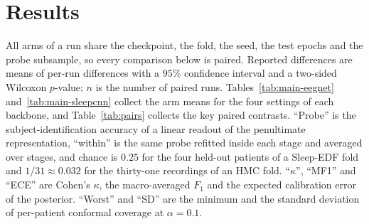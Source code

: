\section{Results}
\label{sec:results}

All arms of a run share the checkpoint, the fold, the seed, the test epochs
and the probe subsample, so every comparison below is paired. Reported
differences are means of per-run differences with a $95\%$ confidence
interval and a two-sided Wilcoxon $p$-value; $n$ is the number of paired runs.
Tables~\ref{tab:main-eegnet} and~\ref{tab:main-sleepcnn} collect the arm means
for the four settings of each backbone, and Table~\ref{tab:pairs} collects the
key paired contrasts. ``Probe'' is the subject-identification accuracy of a
linear readout of the penultimate representation, ``within'' is the same probe
refitted inside each stage and averaged over stages, and chance is $0.25$ for
the four held-out patients of a Sleep-EDF fold and $1/31\approx0.032$ for the
thirty-one recordings of an HMC fold. ``$\kappa$'', ``MF1'' and ``ECE'' are
Cohen's $\kappa$, the macro-averaged $F_1$ and the expected calibration error
of the posterior. ``Worst'' and ``SD'' are the minimum and
the standard deviation of per-patient conformal coverage at $\alpha=0.1$.

\begin{table}[t]
\centering
\caption{EEGNet: mean over runs per arm (five folds $\times$ three seeds on
Sleep-EDF, five folds $\times$ two seeds on HMC). ``Probe'' and ``Within'' are
subject identification overall and within stage; ``$\kappa$'' and ``MF1'' are
Cohen's $\kappa$ and the macro-averaged $F_1$; ``ECE'' is the expected
calibration error; ``Worst'' and ``SD'' are the
minimum and standard deviation of per-patient conformal coverage at
$\alpha=0.1$. Standard AdaBN and the batch-normalization Tent procedure are
not applicable to group-normalized checkpoints and are omitted there.}
\label{tab:main-eegnet}
\resizebox{\textwidth}{!}{}
\end{table}

\begin{table}[t]
\centering
\caption{SleepCNN, same layout as Table~\ref{tab:main-eegnet}; Sleep-EDF
SleepCNN uses one seed per fold (five runs per arm) and HMC uses two (ten
runs per arm).}
\label{tab:main-sleepcnn}
\resizebox{\textwidth}{!}{}
\end{table}

\begin{table}[t]
\centering
\caption{Paired differences for the key contrasts, with the Wilcoxon
$p$-value in parentheses. Upper block: accuracy. Lower block: within-stage
subject probe. A negative probe difference means less identity.}
\label{tab:pairs}
\small
\resizebox{\columnwidth}{!}{}
\end{table}

